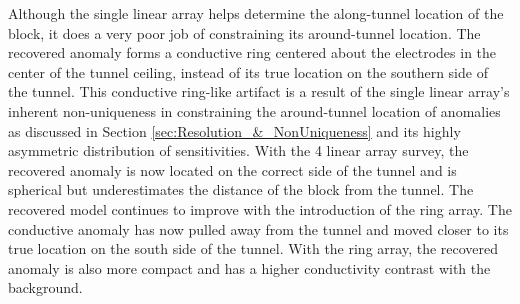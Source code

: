 \documentclass[preprint,authoryear,12pt]{elsarticle}
\begin{document}
Although the single linear array helps determine the along-tunnel location of the block, it does a very poor job of constraining its around-tunnel location. The recovered anomaly forms a conductive ring centered about the electrodes in the center of the tunnel ceiling, instead of its true location on the southern side of the tunnel. This conductive ring-like artifact is a result of the single linear array's inherent non-uniqueness in constraining the around-tunnel location of anomalies as discussed in Section \ref{sec:Resolution_&_NonUniqueness} and its highly asymmetric distribution of sensitivities. With the 4 linear array survey, the recovered anomaly is now located on the correct side of the tunnel and is spherical but underestimates the distance of the block from the tunnel. The recovered model continues to improve with the introduction of the ring array. The conductive anomaly has now pulled away from the tunnel and moved closer to its true location on the south side of the tunnel. With the ring array, the recovered anomaly is also more compact and has a higher conductivity contrast with the background.
\end{document}
